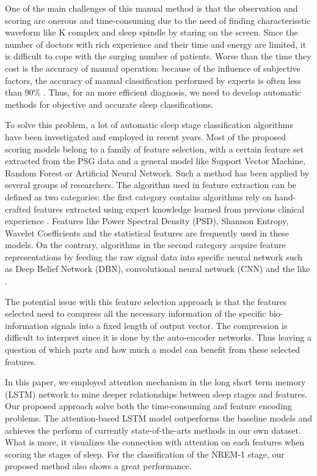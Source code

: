 \documentclass[journal]{IEEEtran}
\begin{document}
One of the main challenges of this manual method is that the observation and scoring are onerous and time-consuming due to the need of finding characterisstic waveform like K complex and sleep spindle by staring on the screen.  Since the number of doctors with rich experience and their time and energy are limited, it is difficult to cope with the surging number of patients. Worse than the time they cost is the accuracy of manual operation: because of the influence of subjective factors, the accuracy of manual classification performed by experts is often less than 90\% \cite{norman2000interobserver}. Thus, for an more efficient diagnosis, we need to develop automatic methods for objective and accurate sleep classifications.

To solve this problem, a lot of automatic sleep stage classification algorithms have been investigated and employed in recent years. Most of the proposed scoring models belong to a family of feature selection, with a certain feature set extracted from the PSG data and a general model like Support Vector Machine, Random Forest or Artificial Neural Network. Such a method has been applied by several groups of researchers. The algorithm used in feature extraction can be defined as two categories: the first category contains algorithms rely on hand-crafted features extracted using expert knowledge learned from previous clinical experience \cite{ebrahimi2008automatic,chapotot2010automated,ronzhina2012sleep,dong2017mixed,nakamura2017complexity}. Features like Power Spectral Density (PSD), Shannon Entropy, Wavelet Coefficients and the statistical features are frequently used in these models. On the contrary, algorithms in the second category acquire feature representations by feeding the raw signal data into specific neural network such as Deep Belief Network (DBN), convolutional neural network (CNN) and the like \cite{ren2014convolutional,langkvist2012sleep,chambon2017deep}.

The potential issue with this feature selection approach is that the features selected need to compress all the necessary information of the specific bio-information signals into a fixed length of output vector. The compression is difficult to interpret since it is done by the auto-encoder networks. Thus leaving a question of which parts and how much a model can benefit from these selected features.
 
In this paper, we employed attention mechanism in the long short term memory (LSTM) network to mine deeper relationships between sleep stages and features. Our proposed approach solve both the time-consuming and feature encoding problems. The attention-based LSTM model outperforms the baseline models and achieves the perform of currently state-of-the-arts methods in our own dataset. What is more, it visualizes the connection with attention on each features when scoring the stages of sleep. For the classification of the NREM-1 stage, our proposed method also shows a great performance.
\end{document}
